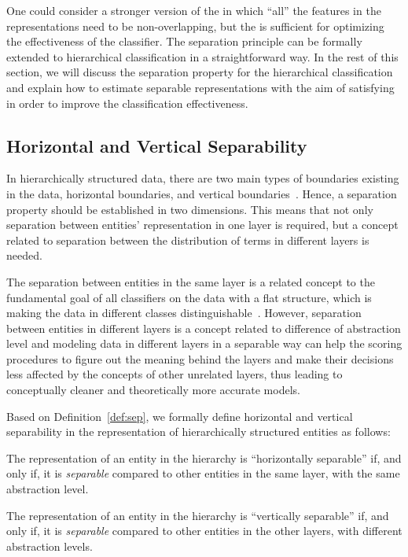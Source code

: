 One could consider a stronger version of the \acssp in which ``all'' the features in the representations need to be non-overlapping, but the \acssp is sufficient for optimizing the effectiveness of the classifier.  The separation principle can be formally extended to hierarchical classification in a straightforward way.  In the rest of this section, we will discuss the separation property for the hierarchical classification and explain how to estimate separable representations with the aim of satisfying \acssp in order to improve the classification effectiveness.

\subsection{Horizontal and Vertical Separability}
\label{subsec:vhs}

In hierarchically structured data, there are two main types of boundaries existing in the data, horizontal boundaries, and vertical boundaries~\citep{Dehghani:2016:ICTIR}. Hence, a separation property should be established in two dimensions. This means that not only separation between entities' representation in one layer is required, but a concept related to separation between the distribution of terms in different layers is needed.

The separation between entities in the same layer is a related concept to the fundamental goal of all classifiers on the data with a flat structure, which is making the data in different classes distinguishable~\citep{Sebastiani:2002}. However, separation between entities in different layers is a concept related to difference of abstraction level and modeling data in different layers in a separable way can help the scoring procedures to figure out the meaning behind the layers and make their decisions less affected by the concepts of other unrelated layers, thus leading to conceptually cleaner and theoretically more accurate models.

Based on Definition~\ref{def:sep}, we formally define horizontal and vertical separability in the representation of hierarchically structured entities as follows:

\begin{mydef}
The representation of an entity in the hierarchy is ``horizontally separable'' if, and only if, it is \emph{separable} compared to other entities in the same layer, with the same abstraction level.
\end{mydef}

\begin{mydef}
The representation of an entity in the hierarchy is ``vertically separable'' if, and only if, it is \emph{separable} compared to other entities in the other layers, with different abstraction levels.
\end{mydef}

